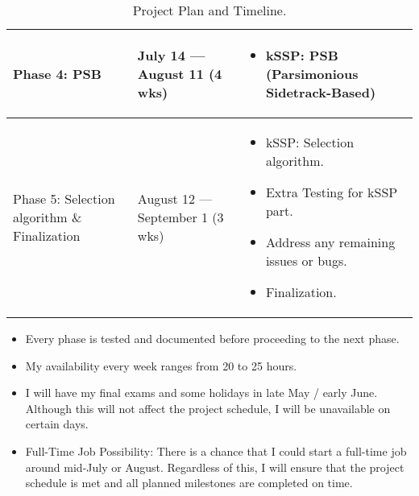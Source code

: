 \begin{table}[H]
\begin{tabularx}{\textwidth}{|p{2.5cm}|p{2.5cm}|X|}
        Phase 4: PSB                                                    & July 14 --- August 11 (4 wks)     &
        \begin{itemize}
            \item kSSP: PSB (Parsimonious Sidetrack-Based)
        \end{itemize}                                                                             \\
        \hline
        Phase 5: Selection algorithm \& Finalization                    & August 12 --- September 1 (3 wks) &
        \begin{itemize}
            \item kSSP: Selection algorithm.
            \item Extra Testing for kSSP part.
            \item Address any remaining issues or bugs.
            \item Finalization.
        \end{itemize}                                                                                \\
        \hline
    \end{tabularx}
    \caption{Project Plan and Timeline.}
\end{table}

\begin{itemize}
    \item Every phase is tested and documented before proceeding to the next phase.
    \item My availability every week ranges from 20 to 25 hours.
    \item I will have my final exams and some holidays in late May / early June. Although
          this will not affect the project schedule, I will be unavailable on certain
          days.
    \item Full-Time Job Possibility: There is a chance that I could start a full-time job
          around mid-July or August. Regardless of this, I will ensure that the project
          schedule is met and all planned milestones are completed on time.
\end{itemize}

